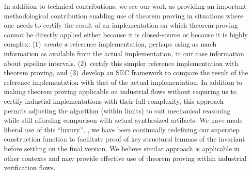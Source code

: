 In addition to technical contributions, we see our work as
providing an important methodological contribution enabling
use of theorem proving in situations where one needs to
certify the result of an implementation on which theorem
proving cannot be directly applied either because it is
closed-source or because it is highly complex: (1)~create a
reference implementation, perhaps using as much information
as available from the actual implementation, in our case
information about pipeline intervals, (2)~certify this
simpler reference implementation with theorem proving, and
(3)~develop an SEC framework to compare the result of the
reference implementation with that of the actual
implementation.  In addition to making theorem proving
applicable on industrial flows without requiring us to
certify industial implementations with their full
complexity, this approach permits adjusting the algorithm
(within limits) to suit mechanical reasoning while still
affording comparison with actual synthesized artifacts.  We
have made liberal use of this ``luxury'', \eg, we have
been continually redefining our superstep construction function
to facilitate proof of key structural lemmas of the
invariant before settling on the final version.  We believe similar approach is applicable in
other contexts and may provide effective use of theorem
proving within industrial verification flows.
